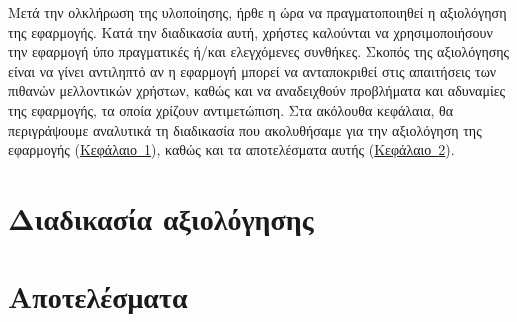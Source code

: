 
Μετά την ολκλήρωση της υλοποίησης, ήρθε η ώρα να πραγματοποιηθεί η αξιολόγηση της εφαρμογής. Κατά την διαδικασία αυτή, χρήστες καλούνται να χρησιμοποιήσουν την εφαρμογή ύπο πραγματικές ή/και ελεγχόμενες συνθήκες. Σκοπός της αξιολόγησης είναι να γίνει αντιληπτό αν η εφαρμογή μπορεί να ανταποκριθεί στις απαιτήσεις των πιθανών μελλοντικών χρήστων, καθώς και να αναδειχθούν προβλήματα και αδυναμίες της εφαρμογής, τα οποία χρίζουν αντιμετώπιση. Στα ακόλουθα κεφάλαια, θα περιγράψουμε αναλυτικά τη διαδικασία που ακολυθήσαμε για την αξιολόγηση της εφαρμογής (\hyperref[sec:evaluationProcess]{Κεφάλαιο~\ref*{sec:evaluationProcess}}), καθώς και τα αποτελέσματα αυτής (\hyperref[sec:evaluationResults]{Κεφάλαιο~\ref*{sec:evaluationResults}}).


\section{Διαδικασία αξιολόγησης}\label{sec:evaluationProcess}


\section{Αποτελέσματα}\label{sec:evaluationResults}
